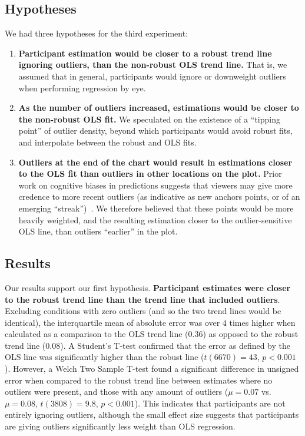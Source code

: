 \documentclass{sigchi}
\begin{document}
\subsection{Hypotheses}

We had three hypotheses for the third experiment:
\begin{enumerate}
	\item \textbf{Participant estimation would be closer to a robust trend line ignoring outliers, than the non-robust OLS trend line.} That is, we assumed that in general, participants would ignore or downweight outliers when performing regression by eye.
	\item \textbf{As the number of outliers increased, estimations would be closer to the non-robust OLS fit.} We speculated on the existence of a ``tipping point'' of outlier density, beyond which participants would avoid robust fits, and interpolate between the robust and OLS fits.
	\item \textbf{Outliers at the end of the chart would result in estimations closer to the OLS fit than outliers in other locations on the plot.} Prior work on cognitive biases in predictions suggests that viewers may give more credence to more recent outliers (as indicative as new anchors points, or of an emerging ``streak'')~\cite{croson2005gambler}. We therefore believed that these points would be more heavily weighted, and the resulting estimation closer to the outlier-sensitive OLS line, than outliers ``earlier'' in the plot.
\end{enumerate}

\subsection{Results}

Our results support our first hypothesis. \textbf{Participant estimates were closer to the robust trend line than the trend line that included outliers}. Excluding conditions with zero outliers (and so the two trend lines would be identical), the interquartile mean of absolute error was over $4$ times higher when calculated as a comparison to the OLS trend line ($0.36$) as opposed to the robust trend line ($0.08$). A Student's T-test confirmed that the error as defined by the OLS line was significantly higher than the robust line ($t(6670)= 43$, $p<0.001$). However, a Welch Two Sample T-test found a significant difference in unsigned error when compared to the robust trend line between estimates where no outliers were present, and those with any amount of outliers ($\mu=0.07$ vs. $\mu=0.08$, $t(3808) = 9.8$, $p<0.001$). This indicates that participants are not entirely ignoring outliers, although the small effect size suggests that participants are giving outliers significantly less weight than OLS regression.
\end{document}
